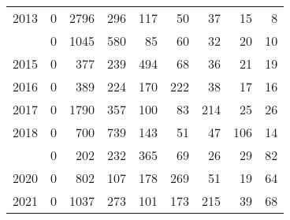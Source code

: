 \documentclass[
]{article}
\begin{document}
\begin{longtable}[t]{lrrrrrrrr}
2013 & 0 & 2796 & 296 & 117 & 50 & 37 & 15 & 8\\
\addlinespace
2014 & 0 & 1045 & 580 & 85 & 60 & 32 & 20 & 10\\
2015 & 0 & 377 & 239 & 494 & 68 & 36 & 21 & 19\\
2016 & 0 & 389 & 224 & 170 & 222 & 38 & 17 & 16\\
2017 & 0 & 1790 & 357 & 100 & 83 & 214 & 25 & 26\\
2018 & 0 & 700 & 739 & 143 & 51 & 47 & 106 & 14\\
\addlinespace
2019 & 0 & 202 & 232 & 365 & 69 & 26 & 29 & 82\\
2020 & 0 & 802 & 107 & 178 & 269 & 51 & 19 & 64\\
2021 & 0 & 1037 & 273 & 101 & 173 & 215 & 39 & 68\\*
\end{longtable}
\end{document}
